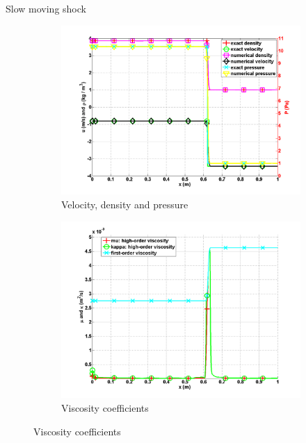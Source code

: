 \documentclass[xcolor=dvipsnames,10pt]{beamer}
\begin{document}
\begin{frame}{Slow moving shock}
\begin{figure}[H]
        \centering
        \begin{subfigure}[b]{0.5\textwidth}
                \centering
                \includegraphics[width=\textwidth]{../figures/SlowMovingShock_density_velocity_pressure_profiles.png}
                \caption{Velocity, density and pressure}
        \end{subfigure}%
        \begin{subfigure}[b]{0.5\textwidth}
                \centering
                \includegraphics[width=\textwidth]{../figures/SlowMovingShock_viscosity.png}
                \caption{Viscosity coefficients}
        \end{subfigure} 
\end{figure} 
\end{frame}
\end{document}
